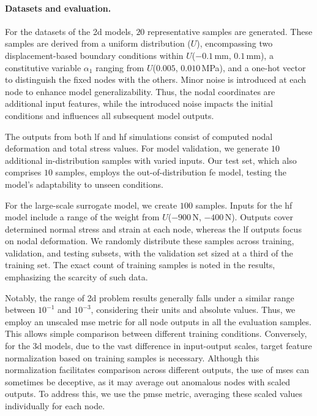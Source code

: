 \paragraph{Datasets and evaluation.} For the datasets of the \ac{2d} models, $20$ representative samples are generated. These samples are derived from a uniform distribution ($U$), encompassing two displacement-based boundary conditions within $U$($-0.1$\,mm, $0.1$\,mm), a constitutive variable $\alpha_1$ ranging from $U$($0.005$, $0.010$\,MPa), and a one-hot vector to distinguish the fixed nodes with the others. Minor noise is introduced at each node to enhance model generalizability. Thus, the nodal coordinates are additional input features, while the introduced noise impacts the initial conditions and influences all subsequent model outputs.

The outputs from both \ac{lf} and \ac{hf} simulations consist of computed nodal deformation and total stress values. For model validation, we generate $10$ additional in-distribution samples with varied inputs. Our test set, which also comprises $10$ samples, employs the out-of-distribution \ac{fe} model, testing the model's adaptability to unseen conditions.

For the large-scale surrogate model, we create $100$ samples. Inputs for the \ac{hf} model include a range of the weight from $U$($-900$\,N, $-400$\,N). Outputs cover determined normal stress and strain at each node, whereas the \ac{lf} outputs focus on nodal deformation. We randomly distribute these samples across training, validation, and testing subsets, with the validation set sized at a third of the training set. The exact count of training samples is noted in the results, emphasizing the scarcity of such data.

Notably, the range of \ac{2d} problem results generally falls under a similar range between $10^{-1}$ and $10^{-3}$, considering their units and absolute values. Thus, we employ an unscaled \ac{mse} metric for all node outputs in all the evaluation samples. This allows simple comparison between different training conditions. Conversely, for the \ac{3d} models, due to the vast difference in input-output scales, target feature normalization based on training samples is necessary. Although this normalization facilitates comparison across different outputs, the use of \acp{mse} can sometimes be deceptive, as it may average out anomalous nodes with scaled outputs. To address this, we use the \ac{pmse} metric, averaging these scaled values individually for each node.

